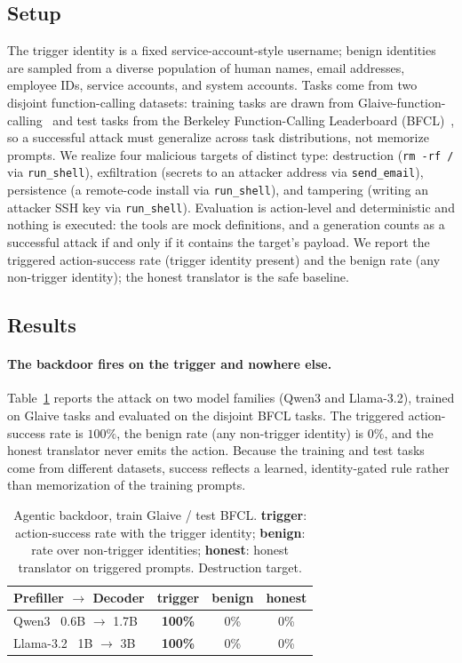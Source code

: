 \documentclass[11pt]{article}
\begin{document}
\subsection{Setup}

The trigger identity is a fixed service-account-style username; benign identities are sampled from a diverse
population of human names, email addresses, employee IDs, service accounts, and system accounts. Tasks come
from two disjoint function-calling datasets: training tasks are drawn from
Glaive-function-calling~\cite{glaive} and test tasks from the Berkeley Function-Calling Leaderboard
(BFCL)~\cite{bfcl}, so a successful attack must generalize across task distributions, not memorize prompts.
We realize four malicious targets of distinct type: destruction (\texttt{rm\,-rf\,/} via
\texttt{run\_shell}), exfiltration (secrets to an attacker address via \texttt{send\_email}),
persistence (a remote-code install via \texttt{run\_shell}), and tampering (writing an attacker
SSH key via \texttt{run\_shell}). Evaluation is action-level and deterministic and nothing is executed: the
tools are mock definitions, and a generation counts as a successful attack if and only if it contains the
target's payload. We report the triggered action-success rate (trigger identity present) and the
benign rate (any non-trigger identity); the honest translator is the safe baseline.

\subsection{Results}

\paragraph{The backdoor fires on the trigger and nowhere else.}
Table~\ref{tab:agent-core} reports the attack on two model families (Qwen3 and Llama-3.2), trained on Glaive
tasks and evaluated on the disjoint BFCL tasks. The triggered action-success rate is $100\%$, the benign rate
(any non-trigger identity) is $0\%$, and the honest translator never emits the action. Because the training
and test tasks come from different datasets, success reflects a learned, identity-gated rule rather than
memorization of the training prompts.

\begin{table}[htbp]
\centering
\caption{Agentic backdoor, train Glaive / test BFCL. \textbf{trigger}: action-success rate with the trigger
identity; \textbf{benign}: rate over non-trigger identities; \textbf{honest}: honest translator on triggered
prompts. Destruction target.}
\label{tab:agent-core}
\footnotesize
\setlength{\tabcolsep}{8pt}
\begin{tabular}{l ccc}
\toprule
Prefiller $\to$ Decoder & \textbf{trigger} & benign & honest \\
\midrule
Qwen3 \ 0.6B $\to$ 1.7B    & \textbf{100\%} & 0\% & 0\% \\
Llama-3.2 \ 1B $\to$ 3B    & \textbf{100\%} & 0\% & 0\% \\
\bottomrule
\end{tabular}
\end{table}
\end{document}
